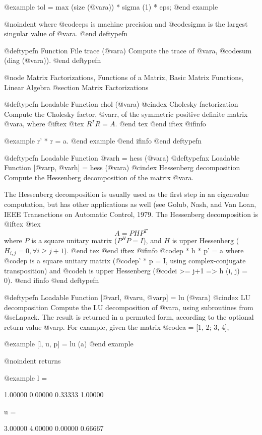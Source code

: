 @example
tol = max (size (@var{a})) * sigma (1) * eps;
@end example

@noindent
where @code{eps} is machine precision and @code{sigma} is the largest
singular value of @var{a}.
@end deftypefn

@deftypefn {Function File} {} trace (@var{a})
Compute the trace of @var{a}, @code{sum (diag (@var{a}))}.
@end deftypefn

@node Matrix Factorizations, Functions of a Matrix, Basic Matrix Functions, Linear Algebra
@section Matrix Factorizations

@deftypefn {Loadable Function} {} chol (@var{a})
@cindex Cholesky factorization
Compute the Cholesky factor, @var{r}, of the symmetric positive definite
matrix @var{a}, where
@iftex
@tex
$ R^T R = A $.
@end tex
@end iftex
@ifinfo

@example
r' * r = a.
@end example
@end ifinfo
@end deftypefn

@deftypefn {Loadable Function} {@var{h} =} hess (@var{a})
@deftypefnx {Loadable Function} {[@var{p}, @var{h}] =} hess (@var{a})
@cindex Hessenberg decomposition
Compute the Hessenberg decomposition of the matrix @var{a}.

The Hessenberg decomposition is usually used as the first step in an
eigenvalue computation, but has other applications as well (see Golub,
Nash, and Van Loan, IEEE Transactions on Automatic Control, 1979.  The
Hessenberg decomposition is
@iftex
@tex
$$
A = PHP^T
$$
where $P$ is a square unitary matrix ($P^HP = I$), and $H$
is upper Hessenberg ($H_{i,j} = 0, \forall i \ge j+1$).
@end tex
@end iftex
@ifinfo
@code{p * h * p' = a} where @code{p} is a square unitary matrix
(@code{p' * p = I}, using complex-conjugate transposition) and @code{h}
is upper Hessenberg (@code{i >= j+1 => h (i, j) = 0}).
@end ifinfo
@end deftypefn

@deftypefn {Loadable Function} {[@var{l}, @var{u}, @var{p}] =} lu (@var{a})
@cindex LU decomposition
Compute the LU decomposition of @var{a}, using subroutines from
@sc{Lapack}.  The result is returned in a permuted form, according to
the optional return value @var{p}.  For example, given the matrix
@code{a = [1, 2; 3, 4]},

@example
[l, u, p] = lu (a)
@end example

@noindent
returns

@example
l =

  1.00000  0.00000
  0.33333  1.00000

u =

  3.00000  4.00000
  0.00000  0.66667

